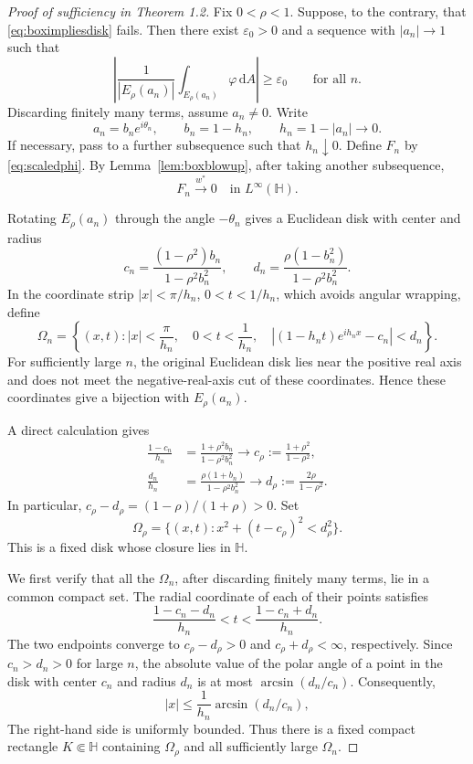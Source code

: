 \documentclass[12pt,a4paper]{article}
\theoremstyle{remark}
\newcommand{\dA}{\,\mathrm dA}
\newcommand{\abs}[1]{\left\lvert#1\right\rvert}
\begin{document}
\begin{proof}[Proof of sufficiency in Theorem 1.2]
Fix $0<\rho<1$. Suppose, to the contrary, that \eqref{eq:boximpliesdisk} fails. Then there exist
$\varepsilon_0>0$ and a sequence with $|a_n|\to1$ such that
\begin{equation}\label{eq:boxcontradiction}
\abs{\frac1{|E_\rho(a_n)|}\int_{E_\rho(a_n)}\varphi\dA}\ge\varepsilon_0
\qquad\text{for all }n.
\end{equation}
Discarding finitely many terms, assume $a_n\ne0$. Write
\[
a_n=b_ne^{i\theta_n},\qquad b_n=1-h_n,\qquad h_n=1-|a_n|\to0.
\]
If necessary, pass to a further subsequence such that $h_n\downarrow0$. Define $F_n$ by \eqref{eq:scaledphi}.
By Lemma~\ref{lem:boxblowup}, after taking another subsequence,
\begin{equation}\label{eq:scaledzero}
F_n\overset{w^*}{\longrightarrow}0\quad\text{in }L^\infty(\mathbb H).
\end{equation}

Rotating $E_\rho(a_n)$ through the angle $-\theta_n$ gives a Euclidean disk with center and radius
\[
c_n=\frac{(1-\rho^2)b_n}{1-\rho^2b_n^2},
\qquad d_n=\frac{\rho(1-b_n^2)}{1-\rho^2b_n^2}.
\]
In the coordinate strip $|x|<\pi/h_n$, $0<t<1/h_n$, which avoids angular wrapping, define
\[
\Omega_n=\left\{(x,t):
|x|<\frac\pi{h_n},\quad 0<t<\frac1{h_n},\quad
\left|(1-h_nt)e^{ih_nx}-c_n\right|<d_n\right\}.
\]
For sufficiently large $n$, the original Euclidean disk lies near the positive real axis and does not meet the negative-real-axis cut of these coordinates.
Hence these coordinates give a bijection with $E_\rho(a_n)$.

A direct calculation gives
\begin{align*}
\frac{1-c_n}{h_n}
&=\frac{1+\rho^2b_n}{1-\rho^2b_n^2}
\longrightarrow c_\rho:=\frac{1+\rho^2}{1-\rho^2},\\
\frac{d_n}{h_n}
&=\frac{\rho(1+b_n)}{1-\rho^2b_n^2}
\longrightarrow d_\rho:=\frac{2\rho}{1-\rho^2}.
\end{align*}
In particular, $c_\rho-d_\rho=(1-\rho)/(1+\rho)>0$.
Set
\[
\Omega_\rho=\{(x,t):x^2+(t-c_\rho)^2<d_\rho^2\}.
\]
This is a fixed disk whose closure lies in $\mathbb H$.


We first verify that all the $\Omega_n$, after discarding finitely many terms, lie in a common compact set.
The radial coordinate of each of their points satisfies
\[
\frac{1-c_n-d_n}{h_n}<t<\frac{1-c_n+d_n}{h_n}.
\]
The two endpoints converge to $c_\rho-d_\rho>0$ and $c_\rho+d_\rho<\infty$, respectively.
Since $c_n>d_n>0$ for large $n$, the absolute value of the polar angle of a point in the disk with center $c_n$ and radius $d_n$
is at most $\arcsin(d_n/c_n)$. Consequently,
\[
|x|\le\frac1{h_n}\arcsin(d_n/c_n),
\]
The right-hand side is uniformly bounded. Thus there is a fixed compact rectangle $K\Subset\mathbb H$ containing $\Omega_\rho$ and all sufficiently large $\Omega_n$.


\end{proof}
\end{document}
